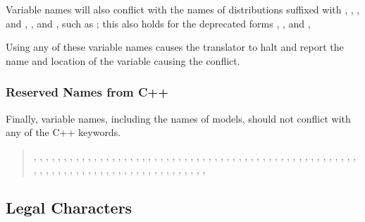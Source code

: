 Variable names will also conflict with the names of distributions
suffixed with , , , and
, , and , such as
; this also holds for the deprecated forms
, , and ,

Using any of these variable names causes the  translator
to halt and report the name and location of the variable causing the
conflict.


\subsubsection{Reserved Names from C++}

Finally, variable names, including the names of models, should not
conflict with any of the C++ keywords.
%
\begin{quote}
,
,
,
,
,
,
,
,
,
,
,
,
,
,
,
,
,
,
,
,
,
,
,
,
,
,
,
,
,
,
,
,
,
,
,
,
,
,
,
,
,
,
,
,
,
,
,
,
,
,
,
,
,
,
,
,
,
,
,
,
,
,
,
,
,
,
,
,
,
,
,
,
,
,
,
,
,
,
,
,
,
,
,
\end{quote}

\subsection{Legal Characters}

